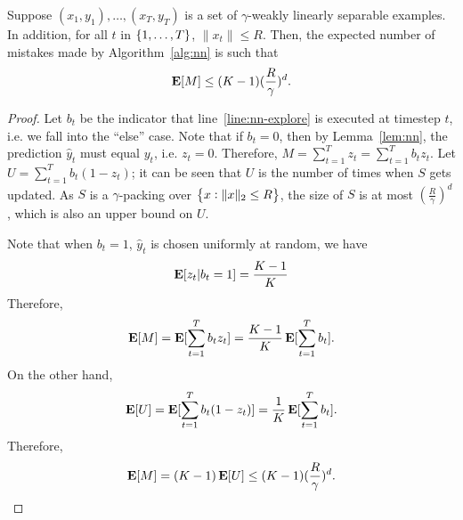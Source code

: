 \begin{theorem}
Suppose $(x_1,y_1), \ldots, (x_T, y_T)$ is a set of $\gamma$-weakly linearly separable examples. In addition, for all $t$ in $\cbr{1,\ldots,T}$, $\| x_t \| \leq R$. Then, the expected number of mistakes made by Algorithm~\ref{alg:nn} is such that
\[\operatorname*{\mathbf{E}}[M] \leq (K-1) (\frac R \gamma)^d. \]
\label{thm:margin_at_upper}
\end{theorem}
\begin{proof}
Let $b_t$ be the indicator that line~\ref{line:nn-explore} is executed at timestep $t$,
i.e. we fall into the ``else'' case.
Note that if $b_t = 0$, then by Lemma~\ref{lem:nn}, the prediction $\hat{y}_t$ must equal $y_t$, i.e. $z_t = 0$.
Therefore, $M = \sum_{t=1}^T z_t = \sum_{t=1}^T b_t z_t$. Let $U = \sum_{t=1}^T b_t (1-z_t)$; it can be seen that $U$ is the number of times when $S$ gets updated. As $S$ is a $\gamma$-packing over
$\cbr{x: \|x\|_2 \leq R}$, the size of $S$ is at most $(\frac R \gamma)^d$, which is also an upper bound on $U$.

Note that when $b_t = 1$, $\hat{y}_t$ is chosen uniformly at random, we have
\[ \operatorname*{\mathbf{E}}[ z_t | b_t = 1] = \frac{K-1}{K} \]
Therefore,
\[ \operatorname*{\mathbf{E}}[M] = \operatorname*{\mathbf{E}}[\sum_{t=1}^T b_t z_t] = \frac{K-1}{K} \operatorname*{\mathbf{E}}[\sum_{t=1}^T b_t]. \]
On the other hand,
\[ \operatorname*{\mathbf{E}}[U] = \operatorname*{\mathbf{E}}[\sum_{t=1}^T b_t (1-z_t)] = \frac 1 K \operatorname*{\mathbf{E}}[\sum_{t=1}^T b_t]. \]
Therefore,
\[ \operatorname*{\mathbf{E}}[M] = (K-1) \operatorname*{\mathbf{E}}[U] \leq (K-1) (\frac R \gamma)^d. \]
\end{proof}
